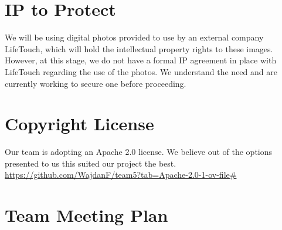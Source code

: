 \documentclass{article}
\begin{document}
\section{IP to Protect}

We will be using digital photos provided to use by an external company LifeTouch, which will hold the intellectual property rights to these images. However, at this stage, we do not have a formal IP agreement in place with LifeTouch regarding the use of the photos. We understand the need and are currently working to secure one before proceeding.

\section{Copyright License}

Our team is adopting an Apache 2.0 license. We believe out of the options presented to us this suited our project the best. \newline
\href{https://github.com/WajdanF/team5?tab=Apache-2.0-1-ov-file\#}{https://github.com/WajdanF/team5?tab=Apache-2.0-1-ov-file\#}



\section{Team Meeting Plan}




\end{document}
